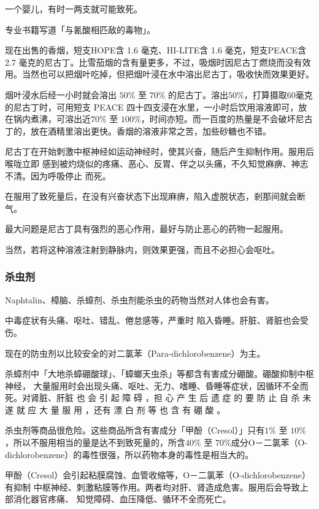 \documentclass[UTF8]{ctexart}
\begin{document}
一个婴儿，有时一两支就可能致死。

专业书籍写道「与氰酸相匹敌的毒物」。

现在出售的香烟，短支HOPE含 1.6 毫克、HI-LITE含 1.6 毫克，短支PEACE含 2.7
毫克的尼古丁。比雪茄烟的含有量更多，不过，吸烟时因尼古丁燃烧而没有效用。当然也可以把烟叶吃掉，但把烟叶浸在水中溶出尼古丁，吸收快而效果更好。

烟叶浸水后经一小时就会溶出 $50\%$ 至 $70\%$ 的尼古丁。溶出$50\%$，打算摄取$60$毫克的尼古丁时，可用短支 PEACE 四十四支浸在水里，一小时后饮用溶液即可，放在锅内煮沸，可溶出近$70\%$ 至 $100\%$，时间亦短。而一百度的热量是不会破坏尼古丁的，放在酒精里溶出更快。香烟的溶液非常之苦，加些砂糖也不错。

尼古丁在开始刺激中枢神经如运动神经时，使其兴奋，随后产生抑制作用。服用后喉咙立即 感到被灼烧似的疼痛、恶心、反胃、伴之以头痛，不久知觉麻痹、神志不清。因为呼吸停止 而死。

在服用了致死量后，在没有兴奋状态下出现麻痹，陷入虚脱状态，剎那间就会断气。

最大问题是尼古丁具有强烈的恶心作用，最好与防止恶心的药物一起服用。

当然，若将这种溶液注射到静脉内，则效果更强，而且不必担心会呕吐。

\subsubsection{杀虫剂}

Naphtalin、樟脑、杀蟑剂、杀虫剂能杀虫的药物当然对人体也会有害。

中毒症状有头痛、呕吐、错乱、倦怠感等，严重时 陷入昏睡。肝脏、肾脏也会受伤。

现在的防虫剂以比较安全的对二氯苯（Para-dichlorobenzene）为主。

杀蟑剂中「大地杀蟑硼酸球」、「蟑螂天虫杀」等都含有害成分硼酸。硼酸抑制中枢神经，
大量服用时会出现头痛、呕吐、无力、嗜睡、昏睡等症状，因循环不全而死。对肾脏、肝脏
也 会 引 起 障 碍 ，担 心 产 生 后 遗 症 的 要 防 止 自 杀 未 遂 就 应 大 量 服 用 ，还有 漂 白 剂 等 也 含 有 硼 酸 。

杀虫剂等商品很危险。这些商品所含有害成分「甲酚（Cresol）」只有$1\%$ 至 $10\%$，所以不服用相当的量是达不到致死量的，所含$40\%$ 至 $70\%$成分O－二氯苯（O-dichlorobenzene）的毒性很强，所以药物本身的毒性是相当大的。

甲酚（Cresol）会引起粘膜腐蚀、血管收缩等，O－二氯苯（O-dichlorobenzene）有抑制
中枢神经、刺激粘膜等作用。两者均对肝、肾造成危害。服用后会导致上部消化器官疼痛、
知觉障碍、血压降低、循环不全而死亡。
\end{document}

